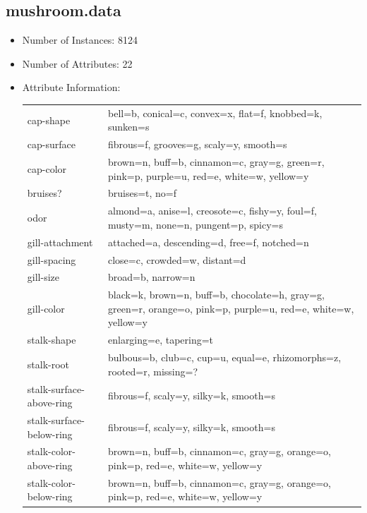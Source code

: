 \documentclass[10pt]{report}
\begin{document}
\subsection*{mushroom.data}
\begin{itemize}
\item Number of Instances: 8124
\item Number of Attributes: 22
\item Attribute Information:
  \\
  \begin{left}
    \begin{tabular}{ l p{10cm} }
      cap-shape                 &     bell=b, conical=c, convex=x, flat=f, knobbed=k, sunken=s \\
      cap-surface               &     fibrous=f, grooves=g, scaly=y, smooth=s \\
      cap-color                 &     brown=n, buff=b, cinnamon=c, gray=g, green=r, pink=p, purple=u, red=e, white=w, yellow=y \\
      bruises?                  &     bruises=t, no=f \\
      odor                      &     almond=a, anise=l, creosote=c, fishy=y, foul=f, musty=m, none=n, pungent=p, spicy=s \\
      gill-attachment           &     attached=a, descending=d, free=f, notched=n \\
      gill-spacing              &     close=c, crowded=w, distant=d \\
      gill-size                 &     broad=b, narrow=n \\
      gill-color                &     black=k, brown=n, buff=b, chocolate=h, gray=g, green=r, orange=o, pink=p, purple=u, red=e, white=w, yellow=y \\
      stalk-shape               &     enlarging=e, tapering=t \\
      stalk-root                &     bulbous=b, club=c, cup=u, equal=e, rhizomorphs=z, rooted=r, missing=? \\
      stalk-surface-above-ring  &     fibrous=f, scaly=y, silky=k, smooth=s \\
      stalk-surface-below-ring  &     fibrous=f, scaly=y, silky=k, smooth=s \\
      stalk-color-above-ring    &     brown=n, buff=b, cinnamon=c, gray=g, orange=o, pink=p, red=e, white=w, yellow=y \\
      stalk-color-below-ring    &     brown=n, buff=b, cinnamon=c, gray=g, orange=o, pink=p, red=e, white=w, yellow=y \\

\end{tabular}
\end{left}
\end{itemize}
\end{document}
